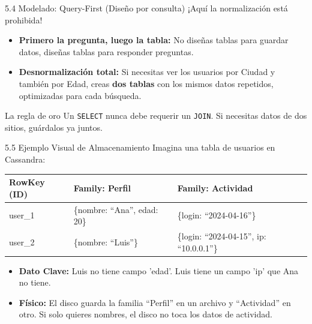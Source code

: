 \begin{frame}{5.4 Modelado: Query-First (Diseño por consulta)}
    ¡Aquí la normalización está prohibida!
    \begin{itemize}
        \item \textbf{Primero la pregunta, luego la tabla:} No diseñas tablas para guardar datos, diseñas tablas para responder preguntas.
        \item \textbf{Desnormalización total:} Si necesitas ver los usuarios por Ciudad y también por Edad, creas \textbf{dos tablas} con los mismos datos repetidos, optimizadas para cada búsqueda.
    \end{itemize}
    \begin{exampleblock}{La regla de oro}
        Un \texttt{SELECT} nunca debe requerir un \texttt{JOIN}. Si necesitas datos de dos sitios, guárdalos ya juntos.
    \end{exampleblock}
\end{frame}

\begin{frame}[fragile]{5.5 Ejemplo Visual de Almacenamiento}
    Imagina una tabla de usuarios en Cassandra:
    \begin{table}[]
    \tiny
    \begin{tabular}{lll}
    \toprule
    \textbf{RowKey (ID)} & \textbf{Family: Perfil} & \textbf{Family: Actividad} \\ \midrule
    user\_1 & \{nombre: ``Ana'', edad: 20\} & \{login: ``2024-04-16''\} \\
    user\_2 & \{nombre: ``Luis''\} & \{login: ``2024-04-15'', ip: ``10.0.0.1''\} \\
    \bottomrule
    \end{tabular}
    \end{table}
    \begin{itemize}
        \item \textbf{Dato Clave:} Luis no tiene campo 'edad'. Luis tiene un campo 'ip' que Ana no tiene.
        \item \textbf{Físico:} El disco guarda la familia ``Perfil'' en un archivo y ``Actividad'' en otro. Si solo quieres nombres, el disco no toca los datos de actividad.
    \end{itemize}
\end{frame}
